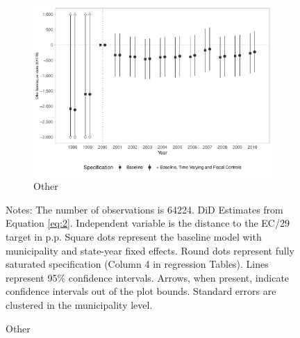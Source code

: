 \begin{figure}[h!]
\begin{center}
    \begin{subfigure}{0.32\textwidth}
        \centering
        \caption{\scriptsize Other}\label{fig:7c}
        \includegraphics[width=\textwidth]{plots/finbra_desp_outros_nature_pcapita_dist_ec29_baseline_dist_ec29_baseline_7.pdf}
    \end{subfigure}
    
    \end{center}
    \scriptsize{Notes: The number of observations is 64224. DiD Estimates from Equation \ref{eq:2}. Independent variable is the distance to the EC/29 target in p.p. Square dots represent the baseline model with municipality and state-year fixed effects. Round dots represent fully saturated specification (Column 4 in regression Tables). Lines represent 95\% confidence intervals. Arrows, when present, indicate confidence intervals out of the plot bounds. Standard errors are clustered in the municipality level.}
    
\end{figure}